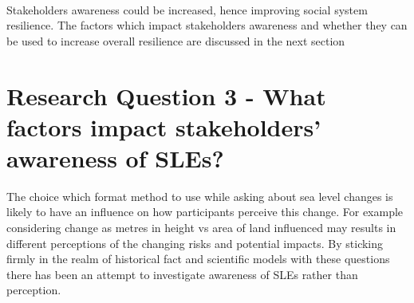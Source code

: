\paragraph{}

\paragraph{}
Stakeholders awareness could be increased, hence improving social system resilience. The factors which impact stakeholders awareness and whether they can be used to increase overall resilience are discussed in the next section 

\section{Research Question 3 - What factors impact stakeholders' awareness of SLEs? }


The choice which format method to use while asking about sea level changes is likely to have an influence on how participants perceive this change. For example considering change as metres in height vs area of land influenced may results in different perceptions of the changing risks and potential impacts.  By sticking firmly in the realm of historical fact and scientific models with these questions there has been an attempt to investigate awareness of SLEs rather than perception. 













